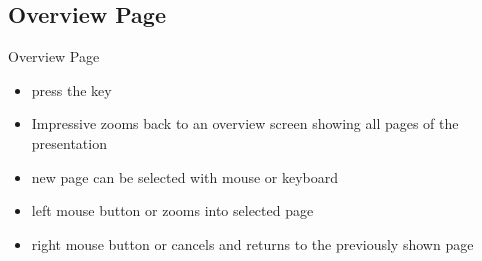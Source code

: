 \documentclass[bigger,hyperref={colorlinks=true,linkcolor=white,urlcolor=blue}]{beamer}
\begin{document}
\subsection{Overview Page}
\begin{frame}{Overview Page}
    \begin{itemize}
        \item press the  key
        \item Impressive zooms back to an overview screen showing all pages
              of the presentation
        \item new page can be selected with mouse or keyboard
        \item left mouse button or \Enter zooms into selected page
        \item right mouse button or  cancels and returns
              to the previously shown page
    \end{itemize}
\end{frame}
\end{document}
